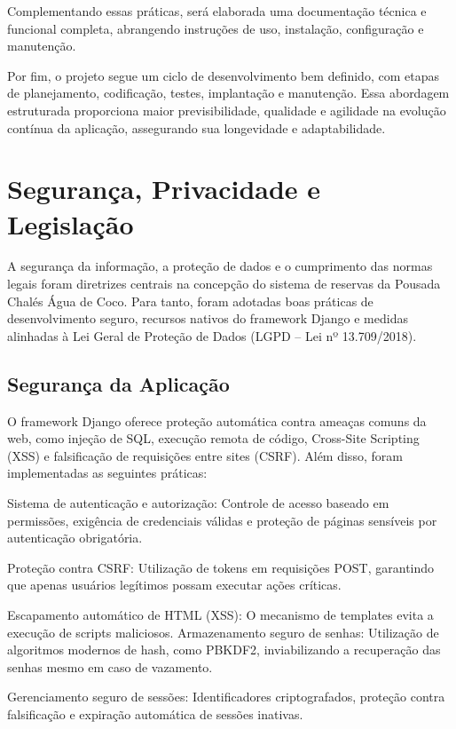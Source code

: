 \documentclass[
	12pt,				%
	openany,			%
	twoside,			%
	a4paper,			%
	english,			%
	french,				%
	spanish,			%
	brazil				%
	]{abntex2}
\begin{document}
Complementando essas práticas, será elaborada uma documentação técnica e funcional completa, abrangendo instruções de uso, instalação, configuração e manutenção.

Por fim, o projeto segue um ciclo de desenvolvimento bem definido, com etapas de planejamento, codificação, testes, implantação e manutenção. Essa abordagem estruturada proporciona maior previsibilidade, qualidade e agilidade na evolução contínua da aplicação, assegurando sua longevidade e adaptabilidade.

\section{Segurança, Privacidade e Legislação}

A segurança da informação, a proteção de dados e o cumprimento das normas legais foram diretrizes centrais na concepção do sistema de reservas da Pousada Chalés Água de Coco. Para tanto, foram adotadas boas práticas de desenvolvimento seguro, recursos nativos do framework Django e medidas alinhadas à Lei Geral de Proteção de Dados (LGPD – Lei nº 13.709/2018).

\subsection{Segurança da Aplicação}

O framework Django oferece proteção automática contra ameaças comuns da web, como injeção de SQL, execução remota de código, Cross-Site Scripting (XSS) e falsificação de requisições entre sites (CSRF). Além disso, foram implementadas as seguintes práticas:

Sistema de autenticação e autorização: Controle de acesso baseado em permissões, exigência de credenciais válidas e proteção de páginas sensíveis por autenticação obrigatória.

Proteção contra CSRF: Utilização de tokens em requisições POST, garantindo que apenas usuários legítimos possam executar ações críticas.

Escapamento automático de HTML (XSS): O mecanismo de templates evita a execução de scripts maliciosos.
Armazenamento seguro de senhas: Utilização de algoritmos modernos de hash, como PBKDF2, inviabilizando a recuperação das senhas mesmo em caso de vazamento.

Gerenciamento seguro de sessões: Identificadores criptografados, proteção contra falsificação e expiração automática de sessões inativas.
\end{document}
